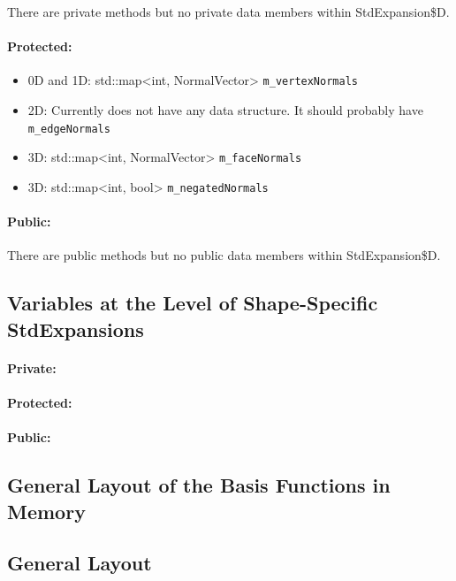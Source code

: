 There are private methods but no private data members within StdExpansion\$D.

\paragraph{Protected:}


\begin{itemize}
\item 0D and 1D: std::map<int, NormalVector> \verb+m_vertexNormals+
%
\item 2D: Currently does not have any data structure.  It should probably have \verb+m_edgeNormals+
%
\item 3D: std::map<int, NormalVector> \verb+m_faceNormals+
%
\item 3D: std::map<int, bool> \verb+m_negatedNormals+
\end{itemize}

\paragraph{Public:}

There are public methods but no public data members within StdExpansion\$D.

\subsection{Variables at the Level of Shape-Specific StdExpansions}

\paragraph{Private:}

\paragraph{Protected:}

\paragraph{Public:}


\subsection{General Layout of the Basis Functions in Memory}

\subsection{General Layout}

